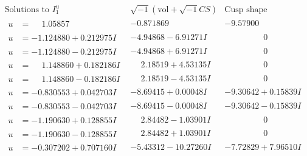 \documentclass[1p]{elsarticle_modified}
\theoremstyle{definition}
\newcommand{\I}{\sqrt{-1}}
\begin{document}
$$\begin{array}{c|c|c}  
\text{Solutions to }I^u_{1}& \I (\text{vol} + \sqrt{-1}CS) & \text{Cusp shape}\\
 \hline 
\begin{aligned}
u &= \phantom{-}1.05857\phantom{ +0.000000I}\end{aligned}
 & -0.871869\phantom{ +0.000000I} & -9.57900\phantom{ +0.000000I} \\ \hline\begin{aligned}
u &= -1.124880 + 0.212975 I\end{aligned}
 & -4.94868 - 6.91271 I & \phantom{-0.000000 } 0 \\ \hline\begin{aligned}
u &= -1.124880 - 0.212975 I\end{aligned}
 & -4.94868 + 6.91271 I & \phantom{-0.000000 } 0 \\ \hline\begin{aligned}
u &= \phantom{-}1.148860 + 0.182186 I\end{aligned}
 & \phantom{-}2.18519 + 4.53135 I & \phantom{-0.000000 } 0 \\ \hline\begin{aligned}
u &= \phantom{-}1.148860 - 0.182186 I\end{aligned}
 & \phantom{-}2.18519 - 4.53135 I & \phantom{-0.000000 } 0 \\ \hline\begin{aligned}
u &= -0.830553 + 0.042703 I\end{aligned}
 & -8.69415 + 0.00048 I & -9.30642 + 0.15839 I \\ \hline\begin{aligned}
u &= -0.830553 - 0.042703 I\end{aligned}
 & -8.69415 - 0.00048 I & -9.30642 - 0.15839 I \\ \hline\begin{aligned}
u &= -1.190630 + 0.128855 I\end{aligned}
 & \phantom{-}2.84482 - 1.03901 I & \phantom{-0.000000 } 0 \\ \hline\begin{aligned}
u &= -1.190630 - 0.128855 I\end{aligned}
 & \phantom{-}2.84482 + 1.03901 I & \phantom{-0.000000 } 0 \\ \hline\begin{aligned}
u &= -0.307202 + 0.707160 I\end{aligned}
 & -5.43312 - 10.27260 I & -7.72829 + 7.96510 I \\ \hline\begin{aligned}

\end{aligned}
\end{array}$$
\end{document}
